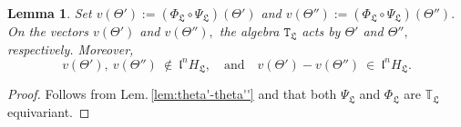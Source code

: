 \documentclass[11pt]{amsart}
\newtheorem{lemma}{Lemma}[section]
\begin{document}
	\begin{lemma}
		Set $v(\Theta'):= (\Phi_\mathfrak{L} \circ \Psi_\mathfrak{L})(\Theta')$ and 
		$v(\Theta''):= (\Phi_\mathfrak{L} \circ \Psi_\mathfrak{L})(\Theta'').$ 
		On the vectors $v(\Theta')$ and $v(\Theta''),$ the algebra $\mathtt{T}_{\mathfrak{L}}$ acts by $\Theta'$ and $\Theta'',$ respectively. Moreover,
		$$
			v(\Theta'), \ v(\Theta'') \ \not\in \ \mathfrak{l}^n  H_\mathfrak{L}, \quad \text{and} \quad 
			v(\Theta')- v(\Theta'') \ \in \ \mathfrak{l}^n  H_{\mathfrak{L}}.
		$$ 
	\label{Lem:congruent-vectors}
	\end{lemma}
	\begin{proof}
	Follows from Lem.\,\ref{lem:theta'-theta''} and that both $\Psi_\mathfrak{L}$ and $\Phi_\mathfrak{L}$ are $\mathbb{T}_\mathfrak{L}$ equivariant.
	\end{proof}
\end{document}
